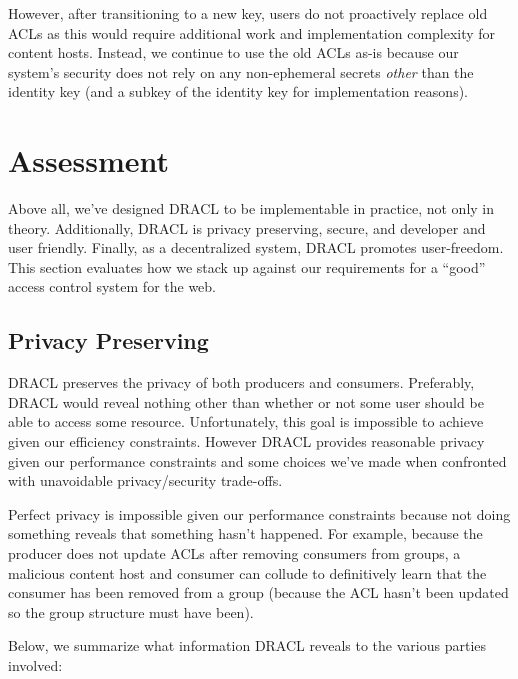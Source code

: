 \documentclass[pdftex,12pt,a4papaer,twoside,notitlepage]{report}
\begin{document}
However, after transitioning to a new key, users do not proactively replace old
ACLs as this would require additional work and implementation complexity for
content hosts. Instead, we continue to use the old ACLs as-is because our
system's security does not rely on any non-ephemeral secrets \emph{other} than
the identity key (and a subkey of the identity key for implementation reasons).

\chapter{Assessment}

Above all, we've designed DRACL to be implementable in practice, not only in
theory. Additionally, DRACL is privacy preserving, secure, and developer and
user friendly. Finally, as a decentralized system, DRACL promotes user-freedom.
This section evaluates how we stack up against our requirements for a ``good''
access control system for the web.

\section{Privacy Preserving}
\label{sec:privacy}

DRACL preserves the privacy of both producers and consumers. Preferably, DRACL
would reveal nothing other than whether or not some user should be able to
access some resource. Unfortunately, this goal is impossible to achieve given
our efficiency constraints. However DRACL provides reasonable privacy given our
performance constraints and some choices we've made when confronted with
unavoidable privacy/security trade-offs.

Perfect privacy is impossible given our performance constraints because not
doing something reveals that something hasn't happened. For example, because the
producer does not update ACLs after removing consumers from groups, a malicious
content host and consumer can collude to definitively learn that the consumer
has been removed from a group (because the ACL hasn't been updated so the group
structure must have been).

Below, we summarize what information DRACL reveals to the various parties involved:
\end{document}

